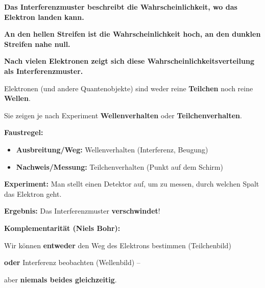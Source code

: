 \documentclass[11pt,a4paper]{article}
\newcommand{\lsg}[1]{\textcolor{loesung}{\textbf{#1}}}
\begin{document}
\lsg{Das Interferenzmuster beschreibt die Wahrscheinlichkeit, wo das Elektron landen kann.}

\lsg{An den hellen Streifen ist die Wahrscheinlichkeit hoch, an den dunklen Streifen nahe null.}

\lsg{Nach vielen Elektronen zeigt sich diese Wahrscheinlichkeitsverteilung als Interferenzmuster.}


\begin{tcolorbox}[merkbox={Kasten 2: Welle-Teilchen-Dualismus}]
Elektronen (und andere Quantenobjekte) sind weder reine \lsg{Teilchen} noch reine \lsg{Wellen}.

\vspace{0.3em}
Sie zeigen je nach Experiment \lsg{Wellenverhalten} oder \lsg{Teilchenverhalten}.

\vspace{0.3em}
\textbf{Faustregel:}
\begin{itemize}[nosep, leftmargin=*]
    \item \textbf{Ausbreitung/Weg:} Wellenverhalten (Interferenz, Beugung)
    \item \textbf{Nachweis/Messung:} Teilchenverhalten (Punkt auf dem Schirm)
\end{itemize}
\end{tcolorbox}

\vspace{0.5em}


\begin{tcolorbox}[merkbox={Kasten 3: Komplementaritätsprinzip}]
\textbf{Experiment:} Man stellt einen Detektor auf, um zu messen, durch welchen Spalt das Elektron geht.

\vspace{0.3em}
\textbf{Ergebnis:} Das Interferenzmuster \lsg{verschwindet}!

\vspace{0.5em}
\textbf{Komplementarität (Niels Bohr):}

Wir können \textbf{entweder} den Weg des Elektrons bestimmen (Teilchenbild)

\textbf{oder} Interferenz beobachten (Wellenbild) –

aber \lsg{niemals beides gleichzeitig}.
\end{tcolorbox}
\end{document}
